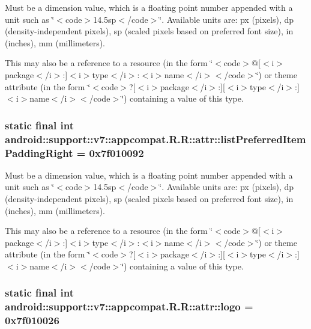 Must be a dimension value, which is a floating point number appended with a unit such as \char`\"{}$<$code$>$14.5sp$<$/code$>$\char`\"{}. Available units are: px (pixels), dp (density-independent pixels), sp (scaled pixels based on preferred font size), in (inches), mm (millimeters). 

This may also be a reference to a resource (in the form \char`\"{}$<$code$>$@\mbox{[}$<$i$>$package$<$/i$>$:\mbox{]}$<$i$>$type$<$/i$>$:$<$i$>$name$<$/i$>$$<$/code$>$\char`\"{}) or theme attribute (in the form \char`\"{}$<$code$>$?\mbox{[}$<$i$>$package$<$/i$>$:\mbox{]}\mbox{[}$<$i$>$type$<$/i$>$:\mbox{]}$<$i$>$name$<$/i$>$$<$/code$>$\char`\"{}) containing a value of this type. \hypertarget{classandroid_1_1support_1_1v7_1_1appcompat_1_1_r_1_1attr_027890b071e276962cfa1c0664765411}{
\subsubsection[{listPreferredItemPaddingRight}]{\setlength{\rightskip}{0pt plus 5cm}static final int android::support::v7::appcompat.R.R::attr::listPreferredItemPaddingRight = 0x7f010092}}
\label{classandroid_1_1support_1_1v7_1_1appcompat_1_1_r_1_1attr_027890b071e276962cfa1c0664765411}


Must be a dimension value, which is a floating point number appended with a unit such as \char`\"{}$<$code$>$14.5sp$<$/code$>$\char`\"{}. Available units are: px (pixels), dp (density-independent pixels), sp (scaled pixels based on preferred font size), in (inches), mm (millimeters). 

This may also be a reference to a resource (in the form \char`\"{}$<$code$>$@\mbox{[}$<$i$>$package$<$/i$>$:\mbox{]}$<$i$>$type$<$/i$>$:$<$i$>$name$<$/i$>$$<$/code$>$\char`\"{}) or theme attribute (in the form \char`\"{}$<$code$>$?\mbox{[}$<$i$>$package$<$/i$>$:\mbox{]}\mbox{[}$<$i$>$type$<$/i$>$:\mbox{]}$<$i$>$name$<$/i$>$$<$/code$>$\char`\"{}) containing a value of this type. \hypertarget{classandroid_1_1support_1_1v7_1_1appcompat_1_1_r_1_1attr_40569bb507b8def39d0a3ff1a7baeb9b}{
\subsubsection[{logo}]{\setlength{\rightskip}{0pt plus 5cm}static final int android::support::v7::appcompat.R.R::attr::logo = 0x7f010026}}
\label{classandroid_1_1support_1_1v7_1_1appcompat_1_1_r_1_1attr_40569bb507b8def39d0a3ff1a7baeb9b}


